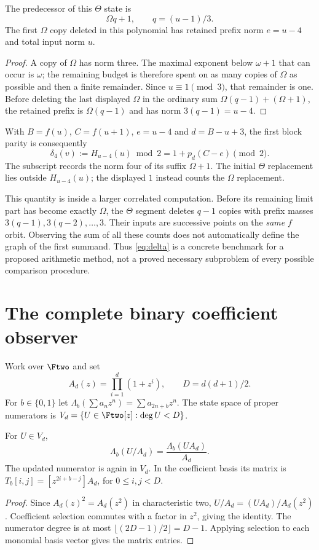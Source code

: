 \documentclass[11pt]{article}
\begin{document}
\begin{lemma}\label{lem:entry}
The predecessor of this $\Theta$ state is
\[
 \Omega q+1,\qquad q=(u-1)/3.
\]
The first $\Omega$ copy deleted in this polynomial has retained
prefix norm $e=u-4$ and total input norm $u$.
\end{lemma}
\begin{proof}
A copy of $\Omega$ has norm three. The maximal exponent below
$\omega+1$ that can occur is $\omega$; the remaining budget
is therefore spent on as many copies of $\Omega$ as possible and
then a finite remainder. Since $u\equiv1\pmod3$, that remainder
is one. Before deleting the last displayed $\Omega$ in the
ordinary sum $\Omega(q-1)+(\Omega+1)$, the retained prefix is
$\Omega(q-1)$ and has norm $3(q-1)=u-4$.
\end{proof}

With $B=f(u)$, $C=f(u+1)$, $e=u-4$ and $d=B-u+3$, the
first block parity is consequently
\begin{equation}\label{eq:delta}
 \delta_4(v):=H_{u-4}(u)\bmod2
       =1+p_d(C-e)\pmod2.
\end{equation}
The subscript records the norm four of its suffix $\Omega+1$.
The initial $\Theta$ replacement lies outside $H_{u-4}(u)$;
the displayed $1$ instead counts the $\Omega$ replacement.

This quantity is inside a larger correlated computation. Before its
remaining limit part has become exactly $\Omega$, the $\Theta$ segment
deletes $q-1$ copies with prefix masses $3(q-1),3(q-2),\ldots,3$. Their inputs
are successive points on the \emph{same} $f$ orbit. Observing the
sum of all these counts does not automatically define the graph of
the first summand. Thus \eqref{eq:delta} is a concrete benchmark for
a proposed arithmetic method, not a proved necessary subproblem of
every possible comparison procedure.

\section{The complete binary coefficient observer}

Work over $\Ftwo$ and set
\[
 A_d(z)=\prod_{i=1}^d(1+z^i),\qquad D=d(d+1)/2.
\]
For $b\in\{0,1\}$ let
$\Lambda_b(\sum a_nz^n)=\sum a_{2n+b}z^n$.
The state space of proper numerators is
$V_d=\{U\in\Ftwo[z]:\deg U<D\}$.

\begin{lemma}\label{lem:matrix}
For $U\in V_d$,
\[
 \Lambda_b(U/A_d)=\frac{\Lambda_b(UA_d)}{A_d}.
\]
The updated numerator is again in $V_d$. In the coefficient basis its
matrix is
$T_b[i,j]=[z^{2i+b-j}]A_d$, for $0\le i,j<D$.
\end{lemma}
\begin{proof}
Since $A_d(z)^2=A_d(z^2)$ in characteristic two,
$U/A_d=(UA_d)/A_d(z^2)$. Coefficient selection commutes with a
factor in $z^2$, giving the identity. The numerator degree is at
most $\lfloor(2D-1)/2\rfloor=D-1$. Applying selection to each
monomial basis vector gives the matrix entries.
\end{proof}
\end{document}
